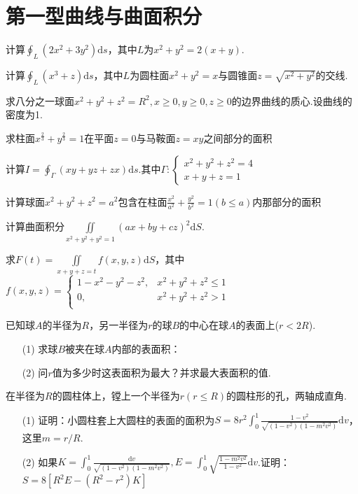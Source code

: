 \section{第一型曲线与曲面积分}
\begin{xiti}
	\item 	计算$\oint_{L}\left(2 x^{2}+3 y^{2}\right) \mathrm{d} s$，其中$L$为$x^{2}+y^{2}=2(x+y)$.
	\item 计算$\oint_{L}\left(x^{3}+z\right) \mathrm{d} s$，其中$L$为圆柱面$x^{2}+y^{2}=x$与圆锥面$z=\sqrt{x^{2}+y^{2}}$的交线.
	
	\item 求八分之一球面$x^{2}+y^{2}+z^{2}=R^{2}, x \geqslant 0, y \geqslant 0, z \geqslant 0$的边界曲线的质心.设曲线的密度为1.
	\item 求柱面$ x^{\frac{2}{3}}+y^{\frac{2}{3}}=1$在平面$z=0$与马鞍面$z=xy$之间部分的面积
	\item 计算$I=\oint_{\Gamma}(x y+y z+z x) \mathrm{d} s$.其中$\Gamma : \left\{\begin{array}{l}{x^{2}+y^{2}+z^{2}=4} \\ {x+y+z=1}\end{array}\right.$
	\item 	计算球面$x^{2}+y^{2}+z^{2}=a^{2}$包含在柱面$\frac{x^{2}}{a^{2}}+\frac{y^{2}}{b^{2}}=1(b \leq a)$内那部分的面积
	\item 计算曲面积分$\iint\limits_{x^2+y^2+y^2=1}{\left(ax+by+cz\right)^2\textrm{d}S}$.
	
	\item 求$F(t)=\iint\limits_{x+y+z=t} f(x, y, z) \mathrm{d} S$，其中$f\left(x,y,z\right)=\left\{\begin{matrix}
	1-x^2-y^2-z^2,&x^2+y^2+z^2\le 1\\
	0,&		x^2+y^2+z^2>1\\
	\end{matrix}\right. $
	
	\item 已知球$A$的半径为$R$，另一半径为$r$的球$B$的中心在球$A$的表面上($r<2R$).
	\begin{enumerate}
		\item [(1)]求球$B$被夹在球$A$内部的表面积：
		\item [(2)]问$r$值为多少时这表面积为最大？并求最大表面积的值.
	\end{enumerate}	
	\item 在半径为$R$的圆柱体上，镗上一个半径为$r(r\leq R)$的圆柱形的孔，两轴成直角.
	\begin{enumerate}
		\item [(1)]证明：小圆柱套上大圆柱的表面的面积为$S=8 r^{2} \int_{0}^{1} \frac{1-v^{2}}{\sqrt{\left(1-v^{2}\right)\left(1-m^{2} v^{2}\right)}} \mathrm{d} v$，这里$m=r/R$.
		\item [(2)]如果$K=\int_{0}^{1} \frac{\mathrm{d} v}{\sqrt{\left(1-v^{2}\right)\left(1-m^{2} v^{2}\right)}},  E=\int_{0}^{1} \sqrt{\frac{1-m^{2} v^{2}}{1-v^{2}}} \mathrm{d} v$.证明：$S=8\left[R^{2} E-\left(R^{2}-r^{2}\right) K\right]$
	\end{enumerate}
	

\end{xiti}
